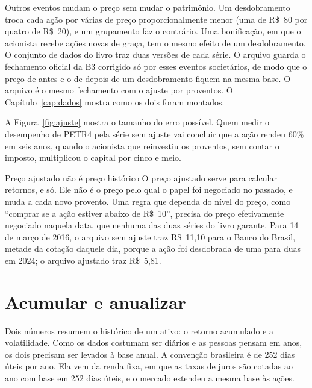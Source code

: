 Outros eventos mudam o preço sem mudar o patrimônio. Um desdobramento troca cada ação por várias de preço proporcionalmente menor (uma de R\$~80 por quatro de R\$~20), e um grupamento faz o contrário. Uma bonificação, em que o acionista recebe ações novas de graça, tem o mesmo efeito de um desdobramento. O conjunto de dados do livro traz duas versões de cada série. O arquivo  guarda o fechamento oficial da B3 corrigido só por esses eventos societários, de modo que o preço de antes e o de depois de um desdobramento fiquem na mesma base. O arquivo  é o mesmo fechamento com o ajuste por proventos. O Capítulo~\ref{cap:dados} mostra como os dois foram montados.


A Figura~\ref{fig:ajuste} mostra o tamanho do erro possível. Quem medir o desempenho de PETR4 pela série sem ajuste vai concluir que a ação rendeu 60\% em seis anos, quando o acionista que reinvestiu os proventos, sem contar o imposto, multiplicou o capital por cinco e meio.

\begin{armadilha}{Preço ajustado não é preço histórico}
O preço ajustado serve para calcular retornos, e só. Ele não é o preço pelo qual o papel foi negociado no passado, e muda a cada novo provento. Uma regra que dependa do nível do preço, como ``comprar se a ação estiver abaixo de R\$~10'', precisa do preço efetivamente negociado naquela data, que nenhuma das duas séries do livro garante. Para 14 de março de 2016, o arquivo sem ajuste traz R\$~11,10 para o Banco do Brasil, metade da cotação daquele dia, porque a ação foi desdobrada de uma para duas em 2024; o arquivo ajustado traz R\$~5,81.
\end{armadilha}

\section{Acumular e anualizar}
\label{sec:anualizar}

Dois números resumem o histórico de um ativo: o retorno acumulado e a volatilidade. Como os dados costumam ser diários e as pessoas pensam em anos, os dois precisam ser levados à base anual. A convenção brasileira é de 252 dias úteis por ano. Ela vem da renda fixa, em que as taxas de juros são cotadas ao ano com base em 252 dias úteis, e o mercado estendeu a mesma base às ações.

